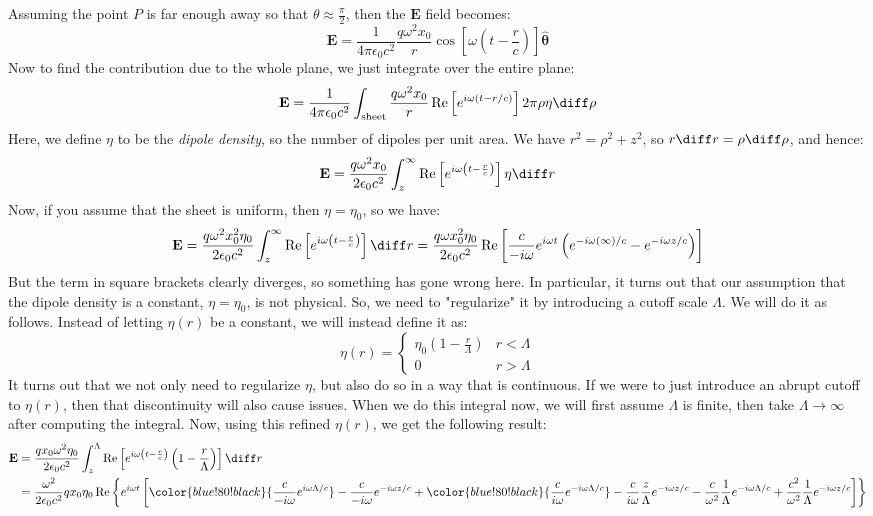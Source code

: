 Assuming the point \( P \) is far enough away so that \( \theta \approx \frac{\pi}{2} \), then the \(
\mathbf{E}  \) field becomes:
\[
	\mathbf{E} = \frac{1}{4 \pi \epsilon_0 c^2}\frac{q \omega^2 x_0}{r} \cos\left[ \omega\left( t
	-\frac{r}{c} \right) \right]\hat{\boldsymbol{\theta}}
\]
Now to find the contribution due to the whole plane, we just integrate over the entire plane:
\[
	\mathbf{E} = \frac{1}{4\pi \epsilon_0 c^2}\int_\text{sheet} \frac{q \omega^2 x_0}{r}\Re\left[ e^{i \omega
	(t - r / c)} \right] 2 \pi \rho \eta \diff \rho
\]
Here, we define \( \eta \) to be the \textit{dipole density}, so the number of dipoles per unit area. We have
\( r^2 = \rho^2 + z^2 \), so \( r \diff r = \rho \diff \rho \), and hence:
\[
	\mathbf{E} = \frac{q \omega^2 x_0}{2 \epsilon_0 c^2}\int_z^{\infty} \Re\left[ e^{i \omega \left( t -
	\frac{r}{c} \right)} \right] \eta \diff r
\]
Now, if you assume that the sheet is uniform, then \( \eta = \eta_0 \), so we have:
\[
	\mathbf{E} = \frac{q \omega^2 x_0^2 \eta_0}{2 \epsilon_0c^2}\int_{z}^{\infty} \Re\left[ e^{i \omega
	\left( t - \frac{r}{c} \right)} \right] \diff r = \frac{q \omega x_0^2 \eta_0}{2 \epsilon_0 c^2}\Re\left[
\frac{c}{-i \omega} e^{ i \omega t} \left( e^{-i \omega (\infty) / c} - e^{-i \omega z / c} \right)\right]
\]
But the term in square brackets clearly diverges, so something has gone wrong here. In particular, it turns
out that our assumption that the dipole density is a constant, \( \eta = \eta_0 \), is not physical. So, we
need to "regularize" it by introducing a cutoff scale \( \Lambda \). We will do it as follows. Instead of
letting \( \eta(r) \) be a constant, we will instead define it as:
\[
	\eta(r) = \begin{cases}
		\eta_0 \left( 1 - \frac{r}{\Lambda} \right) & r < \Lambda\\
		0 & r > \Lambda
	\end{cases}
\]
It turns out that we not only need to regularize \( \eta \), but also do so in a way that is continuous. If
we were to just introduce an abrupt cutoff to \( \eta(r) \), then that discontinuity will also cause issues.
When we do this integral now, we will first assume \( \Lambda \) is finite, then take \( \Lambda \to \infty
\) after computing the integral. Now, using this refined \( \eta(r) \), we get the following result:
\begin{align*}
	\mathbf{E} &= \frac{q x_0 \omega^2 \eta_0}{2 \epsilon_0 c^2}\int_{z}^{\Lambda} 
	\Re\left[ e^{i \omega \left( t - \frac{r}{c} \right)}\left( 1 - \frac{r}{\Lambda} \right) \right] \diff r\\
			   &= \frac{\omega^2}{2 \epsilon_0 c^2} q x_0 \eta_0 \Re\left\{e^{i \omega t}\left[ 
					   {\color{blue!80!black}{\frac{c}{-i \omega}e^{i \omega \Lambda / c}}} - \frac{c}{-i
						   \omega} e^{-i \omega z / c} + 
						   {\color{blue!80!black}{\frac{c}{i \omega} e^{- i \omega \Lambda / c}}} 
						   - \frac{c}{i \omega}\frac{z}{\Lambda} e^{-i \omega z / c}
						   - \frac{c}{\omega^2} \frac{1}{ \Lambda} e^{-i \omega \Lambda / c} 
				   + \frac{c^2}{\omega^2}\frac{1}{\Lambda} e^{-i \omega z / c} 
		   \right] \right\} 
\end{align*}
